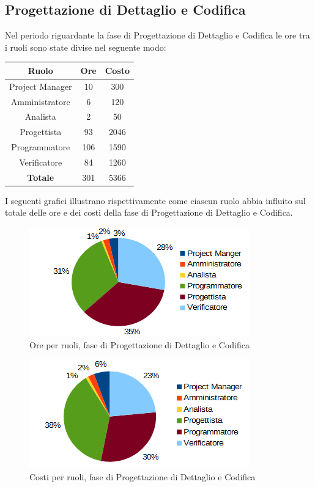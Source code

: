 	\subsection{Progettazione di Dettaglio e Codifica}
	Nel periodo riguardante la fase di Progettazione di Dettaglio e Codifica le ore tra i ruoli sono state divise nel seguente modo: \\
	\begin{table}[H]
		\centering
		\begin{tabular}{|c|c|c|}
			\hline
			\textbf{Ruolo}		& \textbf{Ore}	& \textbf{Costo} \\
			\hline
			Project Manager		& 10			& 300	\\
			Amministratore		& 6				& 120	\\
			Analista			& 2				& 50	\\
			Progettista			& 93			& 2046	\\
			Programmatore		& 106			& 1590	\\
			Verificatore		& 84			& 1260	\\
			\hline
			\textbf{Totale}		& 301			& 5366	\\
			\hline
		\end{tabular}
		\end{table}
	I seguenti grafici illustrano rispettivamente come ciascun ruolo abbia influito sul totale
delle ore e dei costi della fase di Progettazione di Dettaglio e Codifica. \\
	\begin{figure}[H]
		\centering
		\includegraphics[scale=1]{immagini/grafici/progettazione_dettaglio_codifica-torta.png}
		\caption{Ore per ruoli, fase di Progettazione di Dettaglio e Codifica}
	\end{figure}
	\begin{figure}[H]
		\centering
		\includegraphics[scale=1]{immagini/grafici/progettazione_dettaglio_codifica-torta-costo.png}
		\caption{Costi per ruoli, fase di Progettazione di Dettaglio e Codifica}
	\end{figure}
